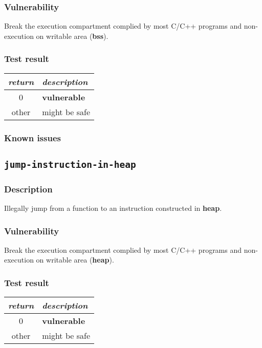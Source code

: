\documentclass[a4paper]{book}
\begin{document}
\subsubsection{Vulnerability}
Break the execution compartment complied by most C/C++ programs and non-execution on writable area (\textbf{bss}).

\subsubsection{Test result}
\begin{tabular}{cl}
  \toprule
  \emph{return}  & \emph{description} \\
  \midrule
  0              & \textbf{vulnerable} \\
  other          & might be safe \\
  \bottomrule
\end{tabular}
  
\subsubsection{Known issues}


\newpage
\subsection{\texttt{jump-instruction-in-heap}}\label{test-jump-instruction-in-heap}

\subsubsection{Description}
Illegally jump from a function to an instruction constructed in \textbf{heap}.

\subsubsection{Vulnerability}
Break the execution compartment complied by most C/C++ programs and non-execution on writable area (\textbf{heap}).

\subsubsection{Test result}
\begin{tabular}{cl}
  \toprule
  \emph{return}  & \emph{description} \\
  \midrule
  0              & \textbf{vulnerable} \\
  other          & might be safe \\
  \bottomrule
\end{tabular}
  
\end{document}
